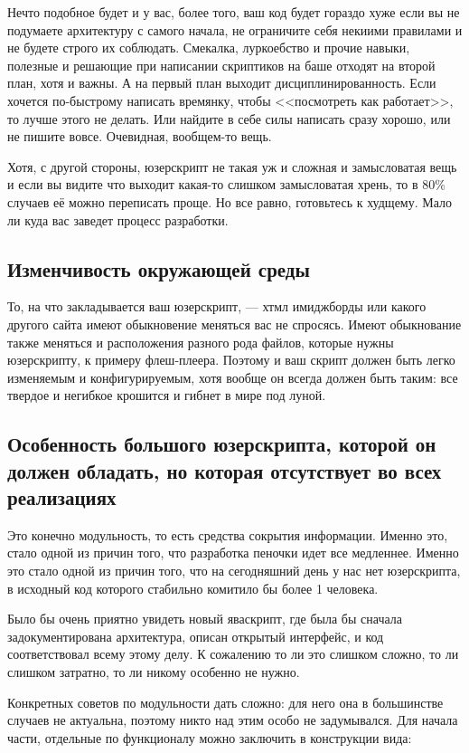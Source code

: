 \documentclass[12pt,a4paper]{article}
\begin{document}
Нечто подобное будет и у вас, более того, ваш код будет гораздо хуже если вы не подумаете архитектуру с самого начала, не ограничите себя некиими правилами и не будете строго их соблюдать. Смекалка, луркоебство и прочие навыки, полезные и решающие при написании скриптиков на баше отходят на второй план, хотя и важны. А на первый план выходит дисциплинированность. Если хочется по-быстрому написать времянку, чтобы <<посмотреть как работает>>, то лучше этого не делать. Или найдите в себе силы написать сразу хорошо, или не пишите вовсе. Очевидная, вообщем-то вещь.

Хотя, с другой стороны, юзерскрипт не такая уж и сложная и замысловатая вещь и если вы видите что выходит какая-то слишком замысловатая хрень, то в 80\% случаев её можно переписать проще. Но все равно, готовьтесь к худщему. Мало ли куда вас заведет процесс разработки.

\subsection{Изменчивость окружающей среды}

То, на что закладывается ваш юзерскрипт, --- хтмл имиджборды или какого другого сайта имеют обыкновение меняться вас не спросясь. Имеют обыкнование также меняться и расположения разного рода файлов, которые нужны юзерскрипту, к примеру флеш-плеера. Поэтому и ваш скрипт должен быть легко изменяемым и конфигурируемым, хотя вообще он всегда должен быть таким: все твердое и негибкое крошится и гибнет в мире под луной.

\subsection{Особенность большого юзерскрипта, которой он должен обладать, но которая отсутствует во всех реализациях}

Это конечно модульность, то есть средства сокрытия информации. Именно это, стало одной из причин того, что разработка пеночки идет все медленнее. Именно это стало одной из причин того, что на сегодняшний день у нас нет юзерскрипта, в исходный код которого стабильно комитило бы более 1 человека.

Было бы очень приятно увидеть новый яваскрипт, где была бы сначала задокументирована архитектура, описан открытый интерфейс, и код соответствовал всему этому делу. К сожалению то ли это слишком сложно, то ли слишком затратно, то ли никому особенно не нужно.

Конкретных советов по модульности дать сложно: для него она в большинстве случаев не актуальна, поэтому никто над этим особо не задумывался. Для начала части, отдельные по функционалу можно заключить в конструкции вида:
\end{document}
